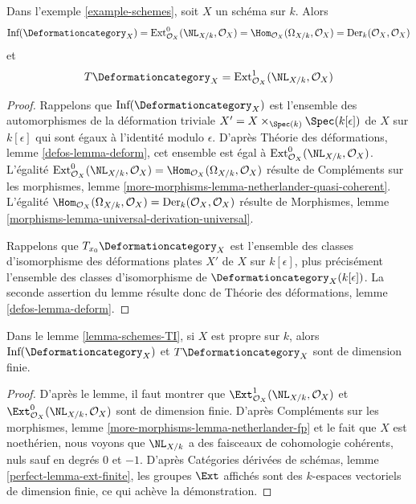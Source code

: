 \begin{lemma}
\label{lemma-schemes-TI}
Dans l'exemple \ref{example-schemes}, soit $X$ un schéma sur $k$. Alors
$$
\text{Inf}(\Deformationcategory_X) =
\text{Ext}^0_{\mathcal{O}_X}(\NL_{X/k}, \mathcal{O}_X) =
\Hom_{\mathcal{O}_X}(\Omega_{X/k}, \mathcal{O}_X) =
\text{Der}_k(\mathcal{O}_X, \mathcal{O}_X)
$$
et
$$
T\Deformationcategory_X =
\text{Ext}^1_{\mathcal{O}_X}(\NL_{X/k}, \mathcal{O}_X)
$$
\end{lemma}

\begin{proof}
Rappelons que $\text{Inf}(\Deformationcategory_X)$ est l'ensemble des
automorphismes de la déformation triviale
$X' = X \times_{\Spec(k)} \Spec(k[\epsilon])$ de $X$ sur $k[\epsilon]$
qui sont égaux à l'identité modulo $\epsilon$.
D'après Théorie des déformations, lemme \ref{defos-lemma-deform},
cet ensemble est égal à $\text{Ext}^0_{\mathcal{O}_X}(\NL_{X/k}, \mathcal{O}_X)$.
L'égalité $\text{Ext}^0_{\mathcal{O}_X}(\NL_{X/k}, \mathcal{O}_X) =
\Hom_{\mathcal{O}_X}(\Omega_{X/k}, \mathcal{O}_X)$ résulte de
Compléments sur les morphismes, lemme
\ref{more-morphisms-lemma-netherlander-quasi-coherent}.
L'égalité
$\Hom_{\mathcal{O}_X}(\Omega_{X/k}, \mathcal{O}_X) =
\text{Der}_k(\mathcal{O}_X, \mathcal{O}_X)$
résulte de Morphismes, lemme
\ref{morphisms-lemma-universal-derivation-universal}.

\medskip\noindent
Rappelons que $T_{x_0}\Deformationcategory_X$ est l'ensemble des classes d'isomorphisme
des déformations plates $X'$ de $X$ sur $k[\epsilon]$, plus précisément
l'ensemble des classes d'isomorphisme de $\Deformationcategory_X(k[\epsilon])$.
La seconde assertion du lemme résulte donc de
Théorie des déformations, lemme \ref{defos-lemma-deform}.
\end{proof}

\begin{lemma}
\label{lemma-proper-schemes-TI}
Dans le lemme \ref{lemma-schemes-TI}, si $X$ est propre sur $k$, alors
$\text{Inf}(\Deformationcategory_X)$ et $T\Deformationcategory_X$ sont
de dimension finie.
\end{lemma}

\begin{proof}
D'après le lemme, il faut montrer que
$\Ext^1_{\mathcal{O}_X}(\NL_{X/k}, \mathcal{O}_X)$ et
$\Ext^0_{\mathcal{O}_X}(\NL_{X/k}, \mathcal{O}_X)$ sont de
dimension finie. D'après Compléments sur les morphismes, lemme
\ref{more-morphisms-lemma-netherlander-fp}
et le fait que $X$ est noethérien, nous voyons que
$\NL_{X/k}$ a des faisceaux de cohomologie cohérents, nuls sauf
en degrés $0$ et $-1$.
D'après Catégories dérivées de schémas, lemme \ref{perfect-lemma-ext-finite},
les groupes $\Ext$ affichés sont des $k$-espaces vectoriels de dimension finie,
ce qui achève la démonstration.
\end{proof}

